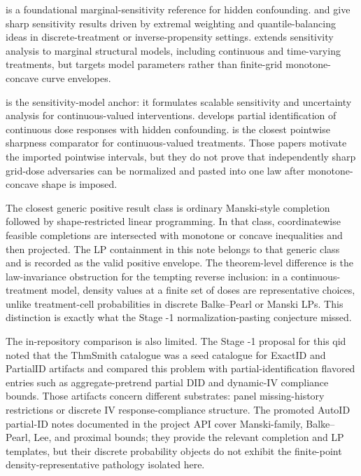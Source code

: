 \documentclass[11pt]{article}
\theoremstyle{definition}
\theoremstyle{plain}
\theoremstyle{remark}
\begin{document}
\cite{Tan2006} is a foundational marginal-sensitivity reference for hidden confounding.  \cite{YadlowskyNamkoongBasuDuchiTian2022} and \cite{DornGuo2023} give sharp sensitivity results driven by extremal weighting and quantile-balancing ideas in discrete-treatment or inverse-propensity settings.  \cite{BonviniKennedyVenturaWasserman2022} extends sensitivity analysis to marginal structural models, including continuous and time-varying treatments, but targets model parameters rather than finite-grid monotone-concave curve envelopes.

\cite{JessonDouglasManshausenSolalMeinshausenStierGalShalit2022} is the sensitivity-model anchor: it formulates scalable sensitivity and uncertainty analysis for continuous-valued interventions.  \cite{MarmarelisHaddadJessonJahanshadGalstyanVerSteeg2023} develops partial identification of continuous dose responses with hidden confounding.  \cite{BaitairianSebastienJreichKatsahianGuilloux2025} is the closest pointwise sharpness comparator for continuous-valued treatments.  Those papers motivate the imported pointwise intervals, but they do not prove that independently sharp grid-dose adversaries can be normalized and pasted into one law after monotone-concave shape is imposed.

The closest generic positive result class is ordinary Manski-style completion followed by shape-restricted linear programming.  In that class, coordinatewise feasible completions are intersected with monotone or concave inequalities and then projected.  The LP containment in this note belongs to that generic class and is recorded as the valid positive envelope.  The theorem-level difference is the law-invariance obstruction for the tempting reverse inclusion: in a continuous-treatment model, density values at a finite set of doses are representative choices, unlike treatment-cell probabilities in discrete Balke--Pearl or Manski LPs.  This distinction is exactly what the Stage -1 normalization-pasting conjecture missed.

The in-repository comparison is also limited.  The Stage -1 proposal for this qid noted that the ThmSmith catalogue was a seed catalogue for ExactID and PartialID artifacts and compared this problem with partial-identification flavored entries such as aggregate-pretrend partial DID and dynamic-IV compliance bounds.  Those artifacts concern different substrates: panel missing-history restrictions or discrete IV response-compliance structure.  The promoted AutoID partial-ID notes documented in the project API cover Manski-family, Balke--Pearl, Lee, and proximal bounds; they provide the relevant completion and LP templates, but their discrete probability objects do not exhibit the finite-point density-representative pathology isolated here.
\end{document}
